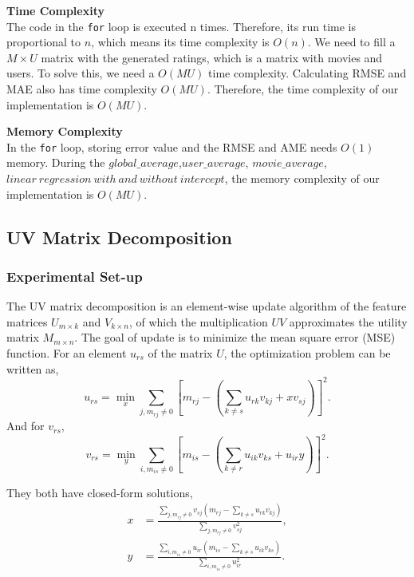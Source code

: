 \documentclass[12pt]{article}
\begin{document}
\vspace{0.3cm}
\noindent\textbf{Time Complexity}\\
The code in the \texttt{for} loop is executed n times. Therefore, its run time is proportional to $n$, which means its time complexity is $O(n)$.
We need to fill a $M \times U$ matrix with the generated ratings, which is a matrix with movies and users.
To solve this, we need a $O(MU)$ time complexity.
 Calculating RMSE and MAE also has time complexity $O(MU)$. Therefore, the time complexity of our implementation is $O(MU)$.\par
\vspace{0.3cm}
\noindent\textbf{Memory Complexity}\\
In the \texttt{for} loop, storing error value and the RMSE and AME needs $O(1)$ memory. During the $global\_average$,$user\_average$, $movie\_average$, $linear\ regression\ with\ and\ without\ intercept$, the memory complexity of our implementation is $O(MU)$.

\subsection{UV Matrix Decomposition}
\subsubsection{Experimental Set-up}
The UV matrix decomposition is an element-wise update algorithm of the feature matrices $U_{m\times k}$ and $V_{k\times n}$, of which the multiplication $UV$ approximates the utility matrix $M_{m\times n}$. The goal of update is to minimize the mean square error (MSE) function. For an element $u_{rs}$ of the matrix $U$, the optimization problem can be written as,
\[
u_{rs} = \min_{x} \sum_{j, m_{rj}\neq 0}\left[ m_{rj}-\left( \sum_{k\neq s}u_{rk}v_{kj} + xv_{sj} \right) \right]^2.
\]
And for $v_{rs}$,
\[
v_{rs} = \min_{y} \sum_{i, m_{is}\neq 0}\left[ m_{is}-\left( \sum_{k\neq r}u_{ik}v_{ks} + u_{ir}y \right) \right]^2.
\]

They both have closed-form solutions,
\begin{align*}
x &= \frac{\sum\limits_{j, m_{rj}\neq 0}v_{sj}\left(m_{rj}-\sum\limits_{k\neq s }u_{rk}v_{kj}\right)}
{\sum\limits_{j, m_{rj}\neq 0}v_{sj}^2},\\
y &= \frac{\sum\limits_{i, m_{is}\neq 0}u_{ir}\left(m_{is}-\sum\limits_{k\neq s }u_{ik}v_{ks}\right)}
{\sum\limits_{i, m_{is}\neq 0}u_{ir}^2}. 
\end{align*}
\end{document}
